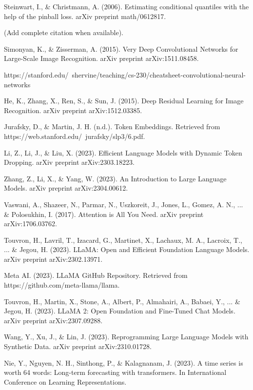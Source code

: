 \begin{thebibliography}{99}
	 Steinwart, I., \& Christmann, A. (2006). Estimating conditional quantiles with the help of the pinball loss. arXiv preprint math/0612817.

	 (Add complete citation when available).

	 Simonyan, K., \& Zisserman, A. (2015). Very Deep Convolutional Networks for Large-Scale Image Recognition. arXiv preprint arXiv:1511.08458.

	 https://stanford.edu/~shervine/teaching/cs-230/cheatsheet-convolutional-neural-networks

	 He, K., Zhang, X., Ren, S., \& Sun, J. (2015). Deep Residual Learning for Image Recognition. arXiv preprint arXiv:1512.03385.

	 Jurafsky, D., \& Martin, J. H. (n.d.). Token Embeddings. Retrieved from https://web.stanford.edu/~jurafsky/slp3/6.pdf.

	 Li, Z., Li, J., \& Liu, X. (2023). Efficient Language Models with Dynamic Token Dropping. arXiv preprint arXiv:2303.18223.

	 Zhang, Z., Li, X., \& Yang, W. (2023). An Introduction to Large Language Models. arXiv preprint arXiv:2304.00612.

	 Vaswani, A., Shazeer, N., Parmar, N., Uszkoreit, J., Jones, L., Gomez, A. N., ... \& Polosukhin, I. (2017). Attention is All You Need. arXiv preprint arXiv:1706.03762.

	 Touvron, H., Lavril, T., Izacard, G., Martinet, X., Lachaux, M. A., Lacroix, T., ... \& Jegou, H. (2023). LLaMA: Open and Efficient Foundation Language Models. arXiv preprint arXiv:2302.13971.

	 Meta AI. (2023). LLaMA GitHub Repository. Retrieved from https://github.com/meta-llama/llama.

	 Touvron, H., Martin, X., Stone, A., Albert, P., Almahairi, A., Babaei, Y., ... \& Jegou, H. (2023). LLaMA 2: Open Foundation and Fine-Tuned Chat Models. arXiv preprint arXiv:2307.09288.

	 Wang, Y., Xu, J., \& Lin, J. (2023). Reprogramming Large Language Models with Synthetic Data. arXiv preprint arXiv:2310.01728.

	 Nie, Y., Nguyen, N. H., Sinthong, P., \& Kalagnanam, J. (2023). A time series is worth 64 words: Long-term forecasting with transformers. In International Conference on Learning Representations.

\end{thebibliography}
